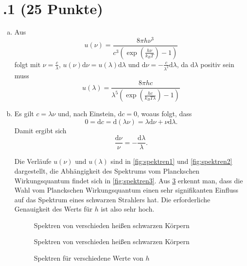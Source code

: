 \section*{\nr.1 \titone (25 Punkte)}
\begin{enumerate}[(a)]
\item Aus 
\begin{equation}
  u(\nu)=\frac{8\pi h\nu^3}{c^3\left(\exp\left(\frac{h\nu}{k_BT}\right)-1\right)}
\end{equation}
folgt mit $\nu=\frac{c}{\lambda}$, $u(\nu)\mathrm{d}\nu=u(\lambda)\mathrm{d}\lambda$ und $\mathrm{d}\nu=-\frac{c}{\lambda^2}\mathrm{d}\lambda$, da $\mathrm{d}\lambda$ positiv sein muss
\begin{equation}
  u(\lambda)=\frac{8\pi hc}{\lambda^5\left(\exp\left(\frac{hc}{k_BT\lambda}\right)-1\right)}
\end{equation}
\item Es gilt $c=\lambda\nu$ und, nach Einstein, $\mathrm{d}c=0$, woaus folgt, dass
\begin{equation}
  0=\mathrm{d}c=\mathrm{d}(\lambda\nu)=\lambda \mathrm{d}\nu+\nu \mathrm{d}\lambda.
\end{equation}
Damit ergibt sich
\begin{equation}
  \frac{\mathrm{d}\nu}{\nu}=-\frac{\mathrm{d}\lambda}{\lambda}.
\end{equation}

Die Verläufe $u(\nu)$ und $u(\lambda)$ sind in \vref{fig:spektren1} und \vref{fig:spektren2} dargestellt, die Abhängigkeit des Spektrums vom Planckschen Wirkungsquantum findet sich in \vref{fig:spektren3}.
Aus \ref{fig:spektren3} erkennt man, dass die Wahl vom Planckschen Wirkungsquantum einen sehr signifikanten Einfluss auf das Spektrum eines schwarzen Strahlers hat. Die erforderliche Genauigkeit des Werts für $h$ ist also sehr hoch.

\begin{figure}[htbp]
\centering

\caption{Spektren von verschieden heißen schwarzen Körpern}
\label{fig:spektren1}
\end{figure}

\begin{figure}[htbp]
\centering
 
\caption{Spektren von verschieden heißen schwarzen Körpern}
\label{fig:spektren2}
\end{figure}

\begin{figure}[htbp]
\centering

\caption{Spektren für verschiedene Werte von $h$}
\label{fig:spektren3}
\end{figure}


\end{enumerate}
